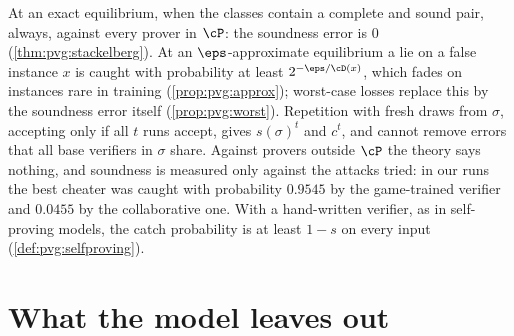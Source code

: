 \begin{refsection}
\questionthree At an exact equilibrium, when the classes contain a complete and sound pair, always, against every prover in $\cP$: the soundness error is $0$ (\cref{thm:pvg:stackelberg}). At an $\eps$-approximate equilibrium a lie on a false instance $x$ is caught with probability at least $2^{-\eps/\cD(x)}$, which fades on instances rare in training (\cref{prop:pvg:approx}); worst-case losses replace this by the soundness error itself (\cref{prop:pvg:worst}). Repetition with fresh draws from $\sigma$, accepting only if all $t$ runs accept, gives $s(\sigma)^t$ and $c^t$, and cannot remove errors that all base verifiers in $\sigma$ share. Against provers outside $\cP$ the theory says nothing, and soundness is measured only against the attacks tried: in our runs the best cheater was caught with probability $0.9545$ by the game-trained verifier and $0.0455$ by the collaborative one. With a hand-written verifier, as in self-proving models, the catch probability is at least $1-s$ on every input (\cref{def:pvg:selfproving}).


\section{What the model leaves out}\label{sec:pvg:leaves}


\end{refsection}

